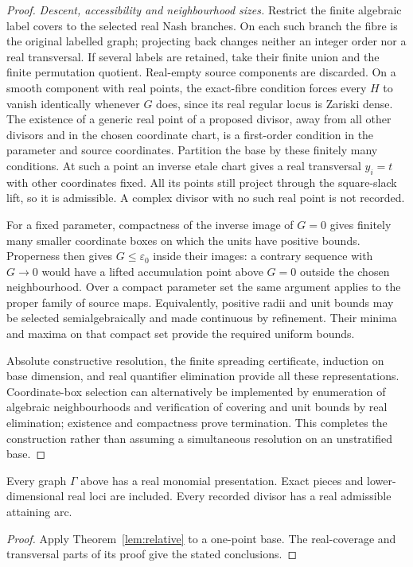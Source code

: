 \begin{proof}
\emph{Descent, accessibility and neighbourhood sizes.}
Restrict the finite algebraic label covers to the selected real Nash
branches. On each such branch the fibre is the original labelled graph;
projecting back changes neither an integer order nor a real transversal.
If several labels are retained, take their finite union and the finite
permutation quotient. Real-empty source components are discarded. On a
smooth component with real points, the exact-fibre condition forces every
$H$ to vanish identically whenever $G$ does, since its real regular locus
is Zariski dense. The existence of a generic real point of a proposed
divisor, away from all other divisors and in the chosen coordinate chart,
is a first-order condition in the parameter and source coordinates.
Partition the base by these finitely many conditions. At such a point
an inverse etale chart gives a real transversal $y_i=t$ with other
coordinates fixed. All its points still project through the square-slack
lift, so it is admissible. A complex divisor with no such real point is
not recorded.

For a fixed parameter, compactness of the inverse image of $G=0$ gives
finitely many smaller coordinate boxes on which the units have positive
bounds. Properness then gives $G\le\varepsilon_0$ inside their images:
a contrary sequence with $G\to0$ would have a lifted accumulation point
above $G=0$ outside the chosen neighbourhood. Over a compact parameter
set the same argument applies to the proper family of source maps.
Equivalently, positive radii and unit bounds may be selected
semialgebraically and made continuous by refinement. Their minima and
maxima on that compact set provide the required uniform bounds.

Absolute constructive resolution, the finite spreading certificate,
induction on base dimension, and real quantifier elimination provide all
these representations. Coordinate-box selection can alternatively be
implemented by enumeration of algebraic neighbourhoods and verification
of covering and unit bounds by real elimination; existence and compactness
prove termination. This completes the construction rather than assuming
a simultaneous resolution on an unstratified base.
\end{proof}

\begin{proposition}\label{prop:real-cover}
Every graph $\Gamma$ above has a real monomial presentation. Exact pieces
and lower-dimensional real loci are included. Every recorded divisor
has a real admissible attaining arc.
\end{proposition}
\begin{proof}
Apply Theorem~\ref{lem:relative} to a one-point base. The real-coverage
and transversal parts of its proof give the stated conclusions.
\end{proof}

